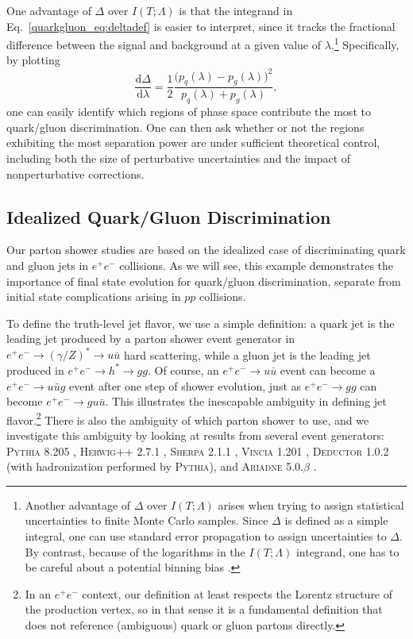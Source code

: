 \documentclass[11pt]{cernrep}
\begin{document}
One advantage of $\Delta$ over $I(T;\Lambda)$ is that the integrand in Eq.~\eqref{quarkgluon_eq:deltadef} is easier to interpret, since it tracks the fractional difference between the signal and background at a given value of $\lambda$.\footnote{Another advantage of $\Delta$ over $I(T; \Lambda)$ arises when trying to assign statistical uncertainties to finite Monte Carlo samples.  Since $\Delta$ is defined as a simple integral, one can use standard error propagation to assign uncertainties to $\Delta$.  By contrast, because of the logarithms in the $I(T; \Lambda)$ integrand, one has to be careful about a potential binning bias \cite{Larkoski:2014pca}.}  Specifically, by plotting 
\begin{equation}
\label{quarkgluon_eq:deltaintegrand}
\frac{\text{d} \Delta}{\text{d} \lambda} = \frac{1}{2} \frac{\bigl(p_q(\lambda) - p_g(\lambda) \bigr)^2}{p_q(\lambda) + p_g(\lambda)},
\end{equation}
one can easily identify which regions of phase space contribute the most to quark/gluon discrimination.  One can then ask whether or not the regions exhibiting the most separation power are under sufficient theoretical control, including both the size of perturbative uncertainties and the impact of nonperturbative corrections.  

\subsection{Idealized Quark/Gluon Discrimination}
\label{quarkgluon_sec:ee}

Our parton shower studies are based on the idealized case of discriminating quark and gluon jets in $e^+ e^-$ collisions.  As we will see, this example demonstrates the importance of final state evolution for quark/gluon discrimination, separate from initial state complications arising in $pp$ collisions.  

To define the truth-level jet flavor, we use a simple definition:  a quark jet is the leading jet produced by a parton shower event generator in $e^+ e^- \to (\gamma/Z)^* \to u \bar{u}$ hard scattering, while a gluon jet is the leading jet produced in $e^+ e^- \to h^* \to gg$.  Of course, an $e^+e^- \to u \bar u$ event can become a $e^+e^- \to u \bar u g$ event after one step of shower evolution, just as $e^+e^- \to g g$ can become $e^+e^- \to g u \bar u$.  This illustrates the inescapable ambiguity in defining jet flavor.\footnote{In an $e^+e^-$ context, our definition at least respects the Lorentz structure of the production vertex, so in that sense it is a fundamental definition that does not reference (ambiguous) quark or gluon partons directly.}  There is also the ambiguity of which parton shower to use, and we investigate this ambiguity by looking at results from several event generators:  \textsc{Pythia 8.205} \cite{Sjostrand:2006za,Sjostrand:2014zea}, \textsc{Herwig++ 2.7.1} \cite{Bahr:2008pv,Bellm:2013hwb}, \textsc{Sherpa 2.1.1} \cite{Gleisberg:2008ta}, \textsc{Vincia 1.201} \cite{Giele:2013ema}, \textsc{Deductor 1.0.2} \cite{Nagy:2014mqa} (with hadronization performed by \textsc{Pythia}), and \textsc{Ariadne 5.0.$\beta$} \cite{Flensburg:2011kk}.
\end{document}
